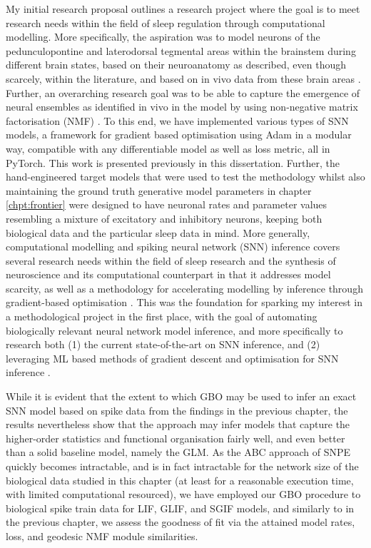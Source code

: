 \documentclass[mphil,deptreport,ianc]{infthesis} %
\begin{document}
My initial research proposal outlines a research project where the goal is to meet research needs within the field of sleep regulation through computational modelling.
More specifically, the aspiration was to model neurons of the pedunculopontine and laterodorsal tegmental areas within the brainstem during different brain states, based on their neuroanatomy as described, even though scarcely, within the literature, and based on in vivo data from these brain areas \cite{Herice2019c, Tsunematsu2019, Pal2007, Martinez-Gonzalez2011, Fraigne2015}.
Further, an overarching research goal was to be able to capture the emergence of neural ensembles as identified in vivo in the model by using non-negative matrix factorisation (NMF) \cite{Seung1999, Seung2001, Onken2016a}.
To this end, we have implemented various types of SNN models, a framework for gradient based optimisation using Adam in a modular way, compatible with any differentiable model as well as loss metric, all in PyTorch. This work is presented previously in this dissertation.
Further, the hand-engineered target models that were used to test the methodology whilst also maintaining the ground truth generative model parameters in chapter \ref{chpt:frontier} were designed to have neuronal rates and parameter values resembling a mixture of excitatory and inhibitory neurons, keeping both biological data and the particular sleep data in mind.
More generally, computational modelling and spiking neural network (SNN) inference covers several research needs within the field of sleep research and the synthesis of neuroscience and its computational counterpart in that it addresses model scarcity, as well as a methodology for accelerating modelling by inference through gradient-based optimisation \cite{Herice2019c, Huh2017, Taherkhani2020}.
This was the foundation for sparking my interest in a methodological project in the first place, with the goal of automating biologically relevant neural network model inference, and more specifically to research both (1) the current state-of-the-art on SNN inference, and (2) leveraging ML based methods of gradient descent and optimisation for SNN inference \cite{Huh2017, Mostafa2020, Tavanaei2019b, Lee2016}.

While it is evident that the extent to which GBO may be used to infer an exact SNN model based on spike data from the findings in the previous chapter, the results nevertheless show that the approach may infer models that capture the higher-order statistics and functional organisation fairly well, and even better than a solid baseline model, namely the GLM.
As the ABC approach of SNPE quickly becomes intractable, and is in fact intractable for the network size of the biological data studied in this chapter (at least for a reasonable execution time, with limited computational resourced), we have employed our GBO procedure to biological spike train data for LIF, GLIF, and SGIF models, and similarly to in the previous chapter, we assess the goodness of fit via the attained model rates, loss, and geodesic NMF module similarities.
\end{document}
